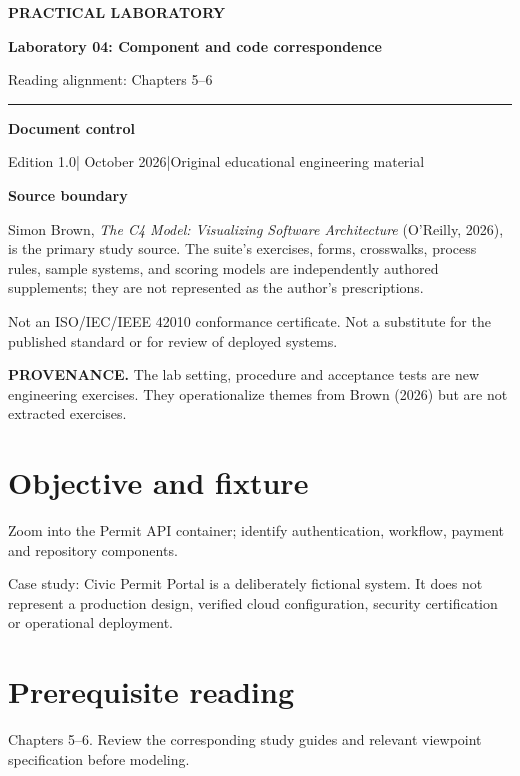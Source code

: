 \documentclass[10pt,letterpaper]{article}
\newcommand{\SourceNote}[1]{\par\smallskip\noindent\colorbox{C4Light}{\parbox{0.94\linewidth}{\footnotesize\textbf{PROVENANCE.} #1}}\par\medskip}
\newcommand{\DocStart}[3]{%
\begin{document}
\begin{titlepage}
\renewcommand{\thepage}{title-\arabic{page}}
\vspace*{0.55in}
{\sffamily\bfseries\small\color{C4Teal}#1}\par\vspace{0.24in}
{\sffamily\bfseries\fontsize{26}{31}\selectfont\color{C4Navy}#2}\par\vspace{0.18in}
{\large\color{C4Gray}#3}\par\vspace{0.4in}
\textcolor{C4Teal}{\rule{\linewidth}{1.15pt}}\par\vspace{0.24in}
\textbf{Document control}\par
Edition 1.0\quad|\quad 30 October 2026\quad|\quad Original educational engineering material\par
\vspace{0.17in}
\textbf{Source boundary}\par
Simon Brown, \emph{The C4 Model: Visualizing Software Architecture} (O'Reilly, 2026), is the primary study source. The suite's exercises, forms, crosswalks, process rules, sample systems, and scoring models are independently authored supplements; they are not represented as the author's prescriptions.\par
\vfill
{\small\color{C4Gray}Not an ISO/IEC/IEEE 42010 conformance certificate. Not a substitute for the published standard or for review of deployed systems.}\par
\end{titlepage}
}
\DocStart{PRACTICAL LABORATORY}{Laboratory 04: Component and code correspondence}{Reading alignment: Chapters 5–6}
\SourceNote{The lab setting, procedure and acceptance tests are new engineering exercises. They operationalize themes from Brown (2026) but are not extracted exercises.}
\section{Objective and fixture}
Zoom into the Permit API container; identify authentication, workflow, payment and repository components.

Case study: Civic Permit Portal is a deliberately fictional system. It does not represent a production design, verified cloud configuration, security certification or operational deployment.


\section{Prerequisite reading}
Chapters 5–6. Review the corresponding study guides and relevant viewpoint specification before modeling.
\end{document}

